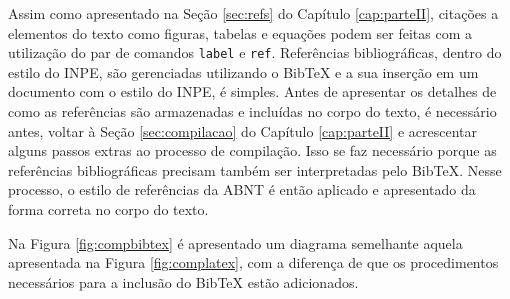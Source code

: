 Assim como apresentado na Seção \ref{sec:refs} do Capítulo \ref{cap:parteII}, citações a elementos do texto como figuras, tabelas e equações podem ser feitas com a utilização do par de comandos {\tt label} e {\tt ref}. Referências bibliográficas, dentro do estilo do INPE, são gerenciadas utilizando o Bib\TeX{} e a sua inserção em um documento com o estilo do INPE, é simples. Antes de apresentar os detalhes de como as referências são armazenadas e incluídas no corpo do texto, é necessário antes, voltar à Seção \ref{sec:compilacao} do Capítulo \ref{cap:parteII} e acrescentar alguns passos extras ao processo de compilação. Isso se faz necessário porque as referências bibliográficas precisam também ser interpretadas pelo Bib\TeX{}. Nesse processo, o estilo de referências da ABNT é então aplicado e apresentado da forma correta no corpo do texto.

Na Figura \ref{fig:compbibtex} é apresentado um diagrama semelhante aquela apresentada na Figura \ref{fig:complatex}, com a diferença de que os procedimentos necessários para a inclusão do Bib\TeX{} estão adicionados.

